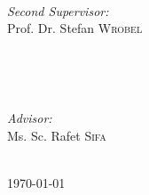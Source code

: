 \begin{titlepage}
\begin{minipage}{0.3\textwidth}
  \begin{flushleft} \large
  \end{flushleft}
\end{minipage}
~
\begin{minipage}{0.6\textwidth}
  \begin{flushright} \large
  \emph{Second Supervisor:} \\
  Prof. Dr. Stefan \textsc{Wrobel} %

  \end{flushright}
\end{minipage}\\[0.5cm]

\begin{minipage}{0.3\textwidth}
  \begin{flushleft} \large
  \end{flushleft}
\end{minipage}
~
\begin{minipage}{0.6\textwidth}
  \begin{flushright} \large
  \emph{Advisor:} \\
  Ms. Sc. Rafet \textsc{Sifa} %

  \end{flushright}
\end{minipage}\\[7cm]



{\large \today}\\[3cm] %




\vfill %

\end{titlepage}
